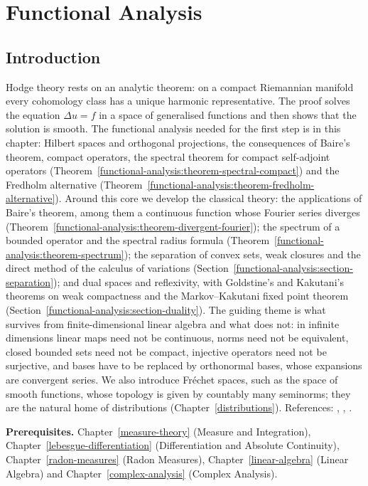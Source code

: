 \chapter{Functional Analysis}\label{functional-analysis}

\section{Introduction}\label{functional-analysis:section-introduction}

Hodge theory rests on an analytic theorem: on a compact Riemannian manifold every cohomology class has a unique harmonic
representative. The proof solves the equation $\Delta u = f$ in a space of generalised functions and then shows that the solution is
smooth. The functional analysis needed for the first step is in this chapter: Hilbert spaces and orthogonal projections, the
consequences of Baire's theorem, compact operators, the spectral theorem for compact self-adjoint operators
(Theorem~\ref{functional-analysis:theorem-spectral-compact}) and the Fredholm alternative
(Theorem~\ref{functional-analysis:theorem-fredholm-alternative}). Around this core we develop the classical theory: the applications of Baire's theorem,
among them a continuous function whose Fourier series diverges (Theorem~\ref{functional-analysis:theorem-divergent-fourier}); the spectrum of a bounded operator and the
spectral radius formula (Theorem~\ref{functional-analysis:theorem-spectrum}); the separation of convex sets, weak closures and the direct method of the calculus of variations
(Section~\ref{functional-analysis:section-separation}); and dual spaces and reflexivity, with Goldstine's and Kakutani's theorems on weak compactness and the Markov--Kakutani fixed point theorem (Section~\ref{functional-analysis:section-duality}). The guiding theme is what survives from finite-dimensional linear algebra and what does not: in infinite
dimensions linear maps need not be continuous, norms need not be equivalent, closed bounded sets need not be compact, injective operators need not be surjective, and bases have to be replaced by
orthonormal bases, whose expansions are convergent series. We also introduce Fr\'echet spaces, such as the space of smooth functions, whose topology is given by countably many seminorms; they are the
natural home of distributions (Chapter~\ref{distributions}). References: \cite{brezis-functional}, \cite{rudin-fa}, \cite{reed-simon-1}.

\noindent\textbf{Prerequisites.} Chapter~\ref{measure-theory} (Measure and Integration), Chapter~\ref{lebesgue-differentiation} (Differentiation and Absolute
Continuity), Chapter~\ref{radon-measures} (Radon Measures), Chapter~\ref{linear-algebra} (Linear Algebra) and Chapter~\ref{complex-analysis} (Complex Analysis).

